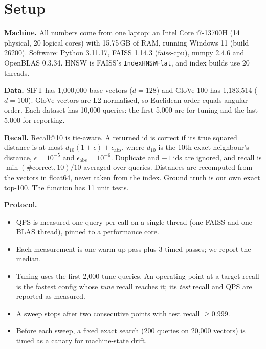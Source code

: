 \documentclass[10pt,twocolumn]{article}
\begin{document}

\section{Setup}

\textbf{Machine.} All numbers come from one laptop: an Intel Core i7-13700H (14 physical, 20
logical cores) with 15.75\,GB of RAM, running Windows 11 (build 26200). Software: Python 3.11.17,
FAISS 1.14.3 (faiss-cpu), numpy 2.4.6 and OpenBLAS 0.3.34. HNSW is FAISS's
\texttt{IndexHNSWFlat}, and index builds use 20 threads.

\textbf{Data.} SIFT has 1,000,000 base vectors ($d{=}128$) and GloVe-100 has 1,183,514
($d{=}100$). GloVe vectors are L2-normalised, so Euclidean order equals angular order. Each
dataset has 10,000 queries: the first 5,000 are for tuning and the last 5,000 for reporting.

\textbf{Recall.} Recall@10 is tie-aware. A returned id is correct if its true squared distance
is at most $d_{10}(1+\epsilon)+\epsilon_{\mathrm{abs}}$, where $d_{10}$ is the 10th exact
neighbour's distance, $\epsilon=10^{-5}$ and $\epsilon_{\mathrm{abs}}=10^{-6}$. Duplicate and $-1$
ids are ignored, and recall is $\min(\#\text{correct},10)/10$ averaged over queries. Distances are
recomputed from the vectors in float64, never taken from the index. Ground truth is our own exact
top-100. The function has 11 unit tests.

\textbf{Protocol.}
\begin{itemize}
\item QPS is measured one query per call on a single thread (one FAISS and one BLAS thread),
  pinned to a performance core.
\item Each measurement is one warm-up pass plus 3 timed passes; we report the median.
\item Tuning uses the first 2,000 tune queries. An operating point at a target recall is the
  fastest config whose \emph{tune} recall reaches it; its \emph{test} recall and QPS are reported
  as measured.
\item A sweep stops after two consecutive points with test recall $\ge$0.999.
\item Before each sweep, a fixed exact search (200 queries on 20,000 vectors) is timed as a
  canary for machine-state drift.
\end{itemize}
\end{document}
